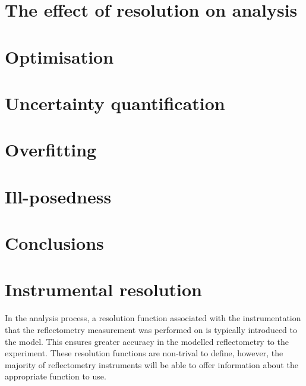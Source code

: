 \documentclass[
 reprint,
 superscriptaddress,
 amsmath,amssymb,
 aps,
]{revtex4-1}
\begin{document}

\section{The effect of resolution on analysis}


\section{Optimisation}



\section{Uncertainty quantification}



\section{Overfitting}

\section{Ill-posedness}


\section{Conclusions}

\section{Instrumental resolution}
In the analysis process, a resolution function associated with the instrumentation that the reflectometry measurement was performed on is typically introduced to the model.
This ensures greater accuracy in the modelled reflectometry to the experiment.
These resolution functions are non-trival to define, however, the majority of reflectometry instruments will be able to offer information about the appropriate function to use.
\end{document}
